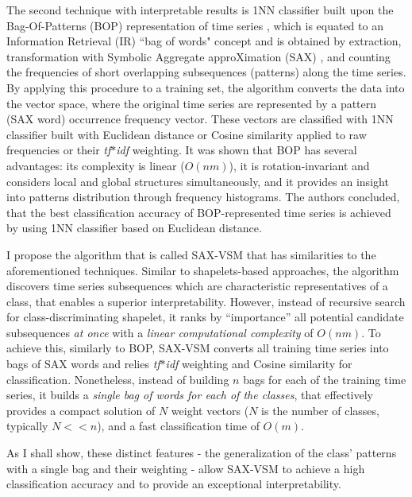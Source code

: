 The second technique with interpretable results is 1NN classifier built upon the Bag-Of-Patterns (BOP) representation of time series 
\cite{citeulike:10525778}, which is equated to an Information Retrieval (IR) ``bag of words" concept 
and is obtained by extraction, transformation with Symbolic Aggregate approXimation (SAX) \cite{sax}, and counting the frequencies
of short overlapping subsequences (patterns) along the time series.
By applying this procedure to a training set, the algorithm converts the data into the vector space, where the original time series are 
represented by a pattern (SAX word) occurrence frequency vector. These vectors are classified with 1NN classifier built with Euclidean 
distance or Cosine similarity applied to raw frequencies or their \textit{tf$\ast$idf} weighting. 
It was shown that BOP has several advantages: its complexity is linear ($O(nm)$), it is rotation-invariant and considers local and 
global structures simultaneously, and it provides an insight into patterns distribution through frequency histograms.
The authors concluded, that the best classification accuracy of BOP-represented time series is achieved by using 1NN classifier based 
on Euclidean distance. 

I propose the algorithm that is called \mbox{SAX-VSM} that has similarities to the aforementioned techniques. 
Similar to shapelets-based approaches, the algorithm discovers time series subsequences which are characteristic representatives of a 
class, that enables a superior interpretability. 
However, instead of recursive search for class-discriminating shapelet, it ranks by “importance” all potential candidate subsequences 
\textit{at once} with a \textit{linear computational complexity} of $O(nm)$.
To achieve this, similarly to BOP, \mbox{SAX-VSM} converts all training time series into bags of SAX words and relies \textit{tf$\ast$idf} 
weighting and Cosine similarity for classification. Nonetheless, instead of building $n$ bags for each of the training time series, 
it builds a \textit{single bag of words for each of the classes}, that effectively provides a compact solution of $N$ weight vectors 
($N$ is the number of classes, typically $N<<n$), and a fast classification time of $O(m)$.

As I shall show, these distinct features - the generalization of the class' patterns with a single bag and their weighting - allow 
SAX-VSM to achieve a high classification accuracy and to provide an exceptional interpretability.


